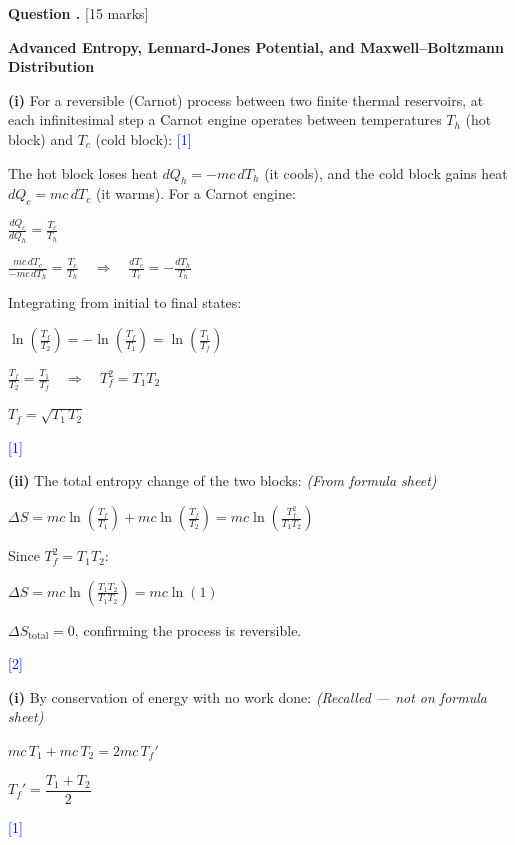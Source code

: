 \documentclass[12pt,a4paper]{article}
\newcounter{questioncounter}
\newcommand{\question}[1]{%
  \stepcounter{questioncounter}%
  \vspace{0.5cm}%
  \noindent\textbf{Question \thequestioncounter.} \hfill [#1 marks]%
  \vspace{0.2cm}%
  \par%
}
\newcommand{\markstep}[1]{\hfill\textcolor{blue}{[#1]}}
\newcommand{\finalanswer}[1]{%
  \begin{tcolorbox}[colback=green!5!white,colframe=green!50!black,boxrule=0.5pt]
  #1
  \end{tcolorbox}
}
\newcommand{\fromsheet}{\textit{(From formula sheet)}}
\newcommand{\recalled}{\textit{(Recalled --- not on formula sheet)}}
\begin{document}
\newpage

\question{15}

\noindent\textbf{Advanced Entropy, Lennard-Jones Potential, and Maxwell--Boltzmann Distribution}

\begin{parts}

\item

\textbf{(i)} For a reversible (Carnot) process between two finite thermal reservoirs, at each infinitesimal step a Carnot engine operates between temperatures $T_h$ (hot block) and $T_c$ (cold block): \markstep{1}

The hot block loses heat $dQ_h = -mc\,dT_h$ (it cools), and the cold block gains heat $dQ_c = mc\,dT_c$ (it warms). For a Carnot engine:

$\frac{dQ_c}{dQ_h} = \frac{T_c}{T_h}$

$\frac{mc\,dT_c}{-mc\,dT_h} = \frac{T_c}{T_h} \quad\Longrightarrow\quad \frac{dT_c}{T_c} = -\frac{dT_h}{T_h}$

Integrating from initial to final states:

$\ln\!\left(\frac{T_f}{T_2}\right) = -\ln\!\left(\frac{T_f}{T_1}\right) = \ln\!\left(\frac{T_1}{T_f}\right)$

$\frac{T_f}{T_2} = \frac{T_1}{T_f} \quad\Longrightarrow\quad T_f^2 = T_1 T_2$

\finalanswer{$T_f = \sqrt{T_1\,T_2}$} \markstep{1}

\textbf{(ii)} The total entropy change of the two blocks: \fromsheet

$\Delta S = mc\ln\!\left(\frac{T_f}{T_1}\right) + mc\ln\!\left(\frac{T_f}{T_2}\right) = mc\ln\!\left(\frac{T_f^2}{T_1 T_2}\right)$

Since $T_f^2 = T_1 T_2$:

$\Delta S = mc\ln\!\left(\frac{T_1 T_2}{T_1 T_2}\right) = mc\ln(1)$

\finalanswer{$\Delta S_\text{total} = 0$, confirming the process is reversible.} \markstep{2}

\item

\textbf{(i)} By conservation of energy with no work done: \recalled

$mc\,T_1 + mc\,T_2 = 2mc\,T_f'$

\finalanswer{$T_f' = \dfrac{T_1 + T_2}{2}$} \markstep{1}


\end{parts}
\end{document}
